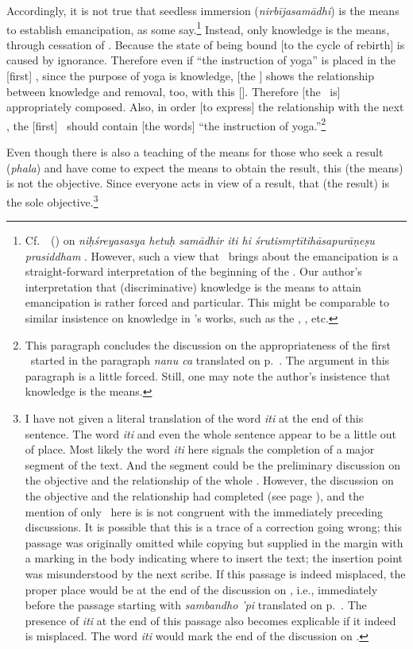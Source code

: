 Accordingly,%
 it is not true that seedless immersion
(\emph{nirbīja\-samādhi}) is the means to establish
emancipation, as some say.\footnote{Cf.\ \Vacaspati\ (\Tattvavaisaradi) on  \emph{%
    niḥśreyasasya hetuḥ samādhir iti hi
    śruti\-smṛtī\-tihāsa\-purāṇe\-ṣu pra\-siddham\dd} \citep[2,4--5]{ys:anss}.  However, such a view that \nirbijasamadhi\ brings about the emancipation is a straight-forward interpretation of the beginning of the \PYS.  Our author's interpretation that (discriminative) knowledge is the means to attain emancipation is rather forced and particular.  This might be comparable to similar insistence on knowledge in \Sankara's works, such as the \BSBh, \BhGBh, etc.}  Instead, only knowledge is the means, through
cessation of \ignorance.  Because the state of being bound [to the cycle of rebirth] is caused by ignorance.
Therefore even if ``the instruction of yoga'' is placed in the [first]
\sutra, since the purpose of yoga is knowledge, [the \Sutrakara]
shows the relationship between knowledge and removal, too, with this
[\sutra].  Therefore [the \sutra\ is] appropriately composed.  Also, in order [to express] the relationship with the next \sutra, the [first] \sutra\ should contain [the words] ``the instruction of yoga.''\footnote{This paragraph concludes the discussion on the appropriateness of the first \sutra\ started in the paragraph \emph{nanu ca}  translated on p.~\pageref{JSTF}.  The argument in this paragraph is a little forced.  Still, one may note the author's insistence that knowledge is the means.}

\medskip
Even%
 though there is also a teaching of the
means for those who seek a result (\emph{phala}) and have come
to expect the means to obtain the result, this (the means) is not the
objective.   Since everyone acts in view of a result, that (the
result) is the sole objective.\footnote{I have not given a literal translation of the word \emph{iti} at the end of this sentence.  The word \emph{iti} and even the whole sentence appear to be a little out of place.  Most likely the word \emph{iti} here signals the completion of a major segment of the text.  And the segment could be the preliminary discussion on the objective and the relationship of the whole \sastra.  However, the discussion on the objective and the relationship had completed (see page \pageref{PSCOMP}), and the mention of only \prayojana\ here is is not congruent with the immediately preceding discussions.  It is possible that this is a trace of a correction going wrong; this passage was originally omitted while copying but supplied in the margin with a marking in the body indicating where to insert the text; the insertion point was misunderstood by the next scribe. If this passage is indeed misplaced, the proper place would be at the end of the discussion on \prayojana, i.e., immediately before the passage starting with \emph{sambandho 'pi}  translated on p.~\pageref{SMBDHPI}. The presence of \emph{iti} at the end of this passage also becomes explicable if it indeed is misplaced. The word \emph{iti} would mark the end of the discussion on \prayojana.}

